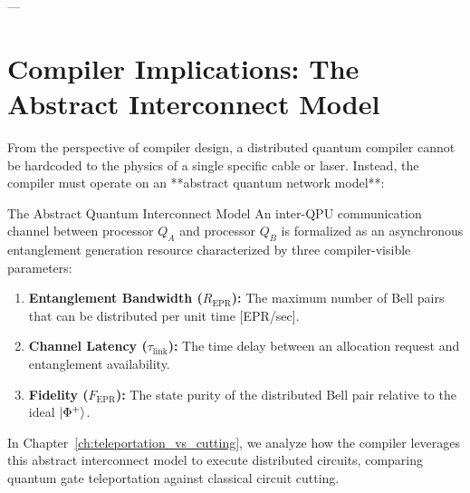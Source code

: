 ---

\section{Compiler Implications: The Abstract Interconnect Model}

From the perspective of compiler design, a distributed quantum compiler cannot be hardcoded to the physics of a single specific cable or laser. Instead, the compiler must operate on an **abstract quantum network model**:

\begin{definitionbox}{The Abstract Quantum Interconnect Model}
An inter-QPU communication channel between processor $Q_A$ and processor $Q_B$ is formalized as an asynchronous entanglement generation resource characterized by three compiler-visible parameters:
\begin{enumerate}
    \item \textbf{Entanglement Bandwidth ($R_{\text{EPR}}$):} The maximum number of Bell pairs that can be distributed per unit time [EPR/sec].
    \item \textbf{Channel Latency ($\tau_{\text{link}}$):} The time delay between an allocation request and entanglement availability.
    \item \textbf{Fidelity ($F_{\text{EPR}}$):} The state purity of the distributed Bell pair relative to the ideal $\ket{\Phi^+}$.
\end{enumerate}
\end{definitionbox}

In Chapter~\ref{ch:teleportation_vs_cutting}, we analyze how the compiler leverages this abstract interconnect model to execute distributed circuits, comparing quantum gate teleportation against classical circuit cutting.
